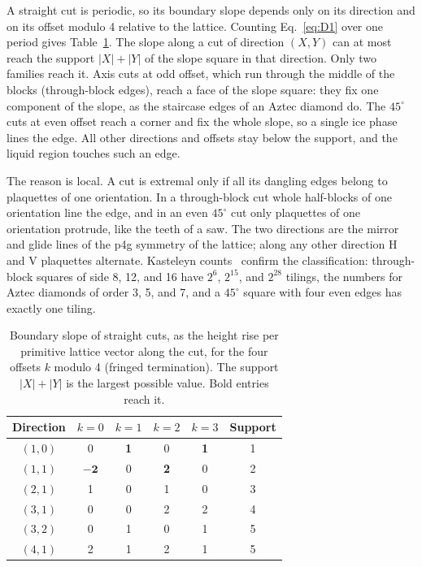 \documentclass[reprint,aps,prb,floatfix,longbibliography,amsmath,amssymb]{revtex4-2}
\begin{document}
A straight cut is periodic, so its boundary slope depends only on its direction and on its offset modulo 4 relative to the lattice. Counting Eq.~\eqref{eq:D1} over one period gives Table~\ref{tab:cuts}. The slope along a cut of direction $(X,Y)$ can at most reach the support $|X|+|Y|$ of the slope square in that direction. Only two families reach it. Axis cuts at odd offset, which run through the middle of the blocks (through-block edges), reach a face of the slope square: they fix one component of the slope, as the staircase edges of an Aztec diamond do. The $45^\circ$ cuts at even offset reach a corner and fix the whole slope, so a single ice phase lines the edge. All other directions and offsets stay below the support, and the liquid region touches such an edge.

The reason is local. A cut is extremal only if all its dangling edges belong to plaquettes of one orientation. In a through-block cut whole half-blocks of one orientation line the edge, and in an even $45^\circ$ cut only plaquettes of one orientation protrude, like the teeth of a saw. The two directions are the mirror and glide lines of the p4g symmetry of the lattice; along any other direction H and V plaquettes alternate. Kasteleyn counts~\cite{Kasteleyn1961,Temperley1961} confirm the classification: through-block squares of side 8, 12, and 16 have $2^6$, $2^{15}$, and $2^{28}$ tilings, the numbers for Aztec diamonds of order 3, 5, and 7, and a $45^\circ$ square with four even edges has exactly one tiling.

\begin{table}[b]
\caption{\label{tab:cuts}Boundary slope of straight cuts, as the height rise per primitive lattice vector along the cut, for the four offsets $k$ modulo 4 (fringed termination). The support $|X|+|Y|$ is the largest possible value. Bold entries reach it.}
\begin{ruledtabular}
\begin{tabular}{cccccc}
Direction & $k=0$ & $k=1$ & $k=2$ & $k=3$ & Support \\
\hline
$(1,0)$ & 0 & \textbf{1} & 0 & \textbf{1} & 1 \\
$(1,1)$ & $\bm{-2}$ & 0 & \textbf{2} & 0 & 2 \\
$(2,1)$ & 1 & 0 & 1 & 0 & 3 \\
$(3,1)$ & 0 & 0 & 2 & 2 & 4 \\
$(3,2)$ & 0 & 1 & 0 & 1 & 5 \\
$(4,1)$ & 2 & 1 & 2 & 1 & 5 \\
\end{tabular}
\end{ruledtabular}
\end{table}
\end{document}
